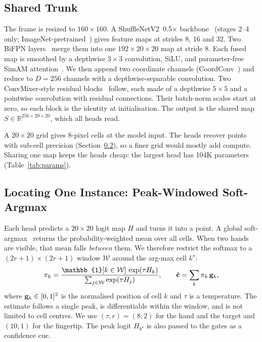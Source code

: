 \subsection{Shared Trunk}\label{sec:trunk}
The frame is resized to $160\times160$. A ShuffleNetV2~0.5$\times$ backbone~\cite{ma2018shufflenet} (stages 2--4 only; ImageNet-pretrained~\cite{deng2009imagenet}) gives feature maps at strides 8, 16 and 32. Two BiFPN layers~\cite{tan2020efficientdet} merge them into one $192\times20\times20$ map at stride 8. Each fused map is smoothed by a depthwise $3\times3$ convolution, SiLU, and parameter-free SimAM attention~\cite{yang2021simam}. We then append two coordinate channels (CoordConv~\cite{liu2018coordconv}) and reduce to $D{=}256$ channels with a depthwise-separable convolution. Two ConvMixer-style residual blocks~\cite{trockman2023patches} follow, each made of a depthwise $5\times5$ and a pointwise convolution with residual connections. Their batch-norm scales start at zero, so each block is the identity at initialisation. The output is the shared map $S\in\mathbb{R}^{256\times20\times20}$, which all heads read.

A $20\times20$ grid gives 8-pixel cells at the model input. The heads recover points with sub-cell precision (Section~\ref{sec:softargmax}), so a finer grid would mostly add compute. Sharing one map keeps the heads cheap: the largest head has 104K parameters (Table~\ref{tab:params}).

\subsection{Locating One Instance: Peak-Windowed Soft-Argmax}\label{sec:softargmax}
Each head predicts a $20\times20$ logit map $H$ and turns it into a point. A global soft-argmax~\cite{sun2018integral} returns the probability-weighted mean over all cells. When two hands are visible, that mean falls \emph{between} them. We therefore restrict the softmax to a $(2r{+}1)\times(2r{+}1)$ window $\mathcal{W}$ around the arg-max cell $k^\star$:
\begin{equation}
\pi_k=\frac{\mathbb{1}[k\in\mathcal{W}]\,\exp(\tau H_k)}{\sum_{j\in\mathcal{W}}\exp(\tau H_j)},\qquad
\hat{\vect{c}}=\sum_k \pi_k\,\cell_k ,
\label{eq:softargmax}
\end{equation}
where $\mathbf{g}_k\in[0,1]^2$ is the normalised position of cell $k$ and $\tau$ is a temperature. The estimate follows a single peak, is differentiable within the window, and is not limited to cell centres. We use $(\tau,r)=(8,2)$ for the hand and the target and $(10,1)$ for the fingertip. The peak logit $H_{k^\star}$ is also passed to the gates as a confidence cue.

